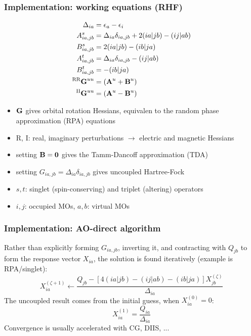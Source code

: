 \documentclass[xcolor=usenames,dvipsnames,svgnames]{beamer}
\begin{document}
\begin{frame}
  \frametitle{Implementation: working equations (RHF)}
  \begin{align*}
    \Delta_{ia} &= \epsilon_{a} - \epsilon_{i} \\
    A_{ia,jb}^{s} &= \Delta_{ia}\delta_{ia,jb} + 2(ia|jb) - (ij|ab) \\
    B_{ia,jb}^{s} &= 2(ia|jb) - (ib|ja) \\
    A_{ia,jb}^{t} &= \Delta_{ia}\delta_{ia,jb} - (ij|ab) \\
    B_{ia,jb}^{t} &= - (ib|ja) \\
    ^{\text{RR}}\boldsymbol{\mathbf{G}}^{uu} &= (\boldsymbol{\mathbf{A}}^{u} + \boldsymbol{\mathbf{B}}^{u}) \\
    ^{\text{II}}\boldsymbol{\mathbf{G}}^{uu} &= (\boldsymbol{\mathbf{A}}^{u} - \boldsymbol{\mathbf{B}}^{u})
  \end{align*}
  \scriptsize
  \begin{itemize}
  \item \(\boldsymbol{\mathbf{G}}\) gives orbital rotation Hessians, equivalen to the random phase approximation (RPA) equations \\
  \item R, I: real, imaginary perturbations \(\rightarrow\) electric and magnetic Hessians \\
  \item setting \(\boldsymbol{\mathbf{B}} = \boldsymbol{\mathbf{0}}\) gives the Tamm-Dancoff approximation (TDA) \\
  \item setting \( G_{ia,jb} = \Delta_{ia}\delta_{ia,jb} \) gives uncoupled Hartree-Fock \\
  \item \(s,t\): singlet (spin-conserving) and triplet (altering) operators \\
  \item \(i,j\): occupied MOs, \(a,b\): virtual MOs
  \end{itemize}
\end{frame}

\begin{frame}
  \frametitle{Implementation: AO-direct algorithm}
  Rather than explicitly forming \(G_{ia,jb}\), inverting it, and contracting with \(Q_{jb}\) to form the response vector \(X_{ia}\), the solution is found iteratively (example is RPA/singlet):
  \begin{equation*}
    X_{ia}^{(\zeta+1)} \leftarrow \frac{Q_{jb} - \left[4(ia|jb) - (ij|ab) - (ib|ja)\right] X_{jb}^{(\zeta)}}{\Delta_{ia}}
  \end{equation*}
  The uncoupled result comes from the initial guess, when \(X_{ia}^{(0)} = 0\):
  \begin{equation*}
    X_{ia}^{(1)} = \frac{Q_{ia}}{\Delta_{ia}}
  \end{equation*}
  Convergence is usually accelerated with CG, DIIS, ...
\end{frame}
\end{document}
